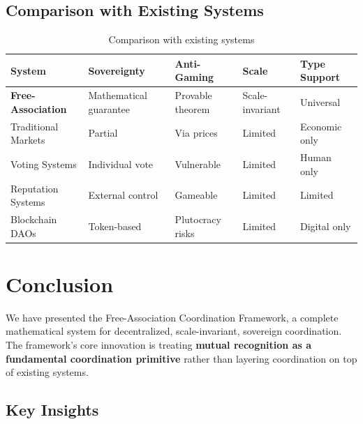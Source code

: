\documentclass[11pt,a4paper]{article}
\theoremstyle{definition}
\theoremstyle{remark}
\begin{document}
\subsection{Comparison with Existing Systems}

\begin{table}[h]
\centering
\begin{tabular}{lllll}
\toprule
\textbf{System} & \textbf{Sovereignty} & \textbf{Anti-Gaming} & \textbf{Scale} & \textbf{Type Support} \\
\midrule
\textbf{Free-Association} & Mathematical guarantee & Provable theorem & Scale-invariant & Universal \\
Traditional Markets & Partial & Via prices & Limited & Economic only \\
Voting Systems & Individual vote & Vulnerable & Limited & Human only \\
Reputation Systems & External control & Gameable & Limited & Limited \\
Blockchain DAOs & Token-based & Plutocracy risks & Limited & Digital only \\
\bottomrule
\end{tabular}
\caption{Comparison with existing systems}
\end{table}

\section{Conclusion}

We have presented the Free-Association Coordination Framework, a complete mathematical system for decentralized, scale-invariant, sovereign coordination. The framework's core innovation is treating \textbf{mutual recognition as a fundamental coordination primitive} rather than layering coordination on top of existing systems.

\subsection{Key Insights}
\end{document}
